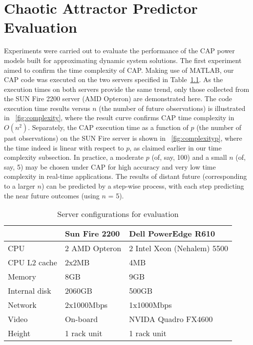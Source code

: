 % 
% 
\chapter{Chaotic Attractor Predictor Evaluation}
\label{chp:evaluation}
Experiments were carried out to evaluate the performance of the CAP
power models built for approximating dynamic system solutions.  The
first experiment aimed to confirm the time complexity of CAP.  Making
use of MATLAB, our CAP code was executed on the two servers specified in
Table~\ref{tab:hardware}.  As the execution times on both servers
provide the same trend, only those collected from the SUN Fire 2200
server (AMD Opteron) are demonstrated here.  The code execution time
results versus $n$ (the number of future observations) is illustrated in
\figurename~\ref{fig:complexity}, where the result curve confirms CAP
time complexity in $O(n^{2})$.  Separately, the CAP execution time as a
function of $p$ (the number of past observations) on the SUN Fire server
is shown in \figurename~\ref{fig:complexityp}, where the time indeed is
linear with respect to $p$, as claimed earlier in our time complexity
subsection.  In practice, a moderate $p$ (of, say, 100) and a small $n$
(of, say, 5) may be chosen under CAP for high accuracy and very low time
complexity in real-time applications.  The results of distant future
(corresponding to a larger $n$) can be predicted by a step-wise process,
with each step predicting the near future outcomes (using $n$ = 5).

\begin{table}[t]
  \centering
  \caption{Server configurations for evaluation}
  \label{tab:hardware}
  \begin{tabular}{l l l}
   \hline
    &\textbf{Sun Fire 2200}&\textbf{Dell PowerEdge R610}\\  
    \hline
    CPU&2 AMD Opteron&2 Intel Xeon (Nehalem) 5500\\
    CPU L2 cache&2x2MB&4MB\\
    Memory&8GB&9GB\\
    Internal disk&2060GB&500GB\\
    Network&2x1000Mbps&1x1000Mbps\\
    Video&On-board&NVIDA Quadro FX4600\\
    Height&1 rack unit&1 rack unit\\
    \hline
  \end{tabular}
\end{table}

